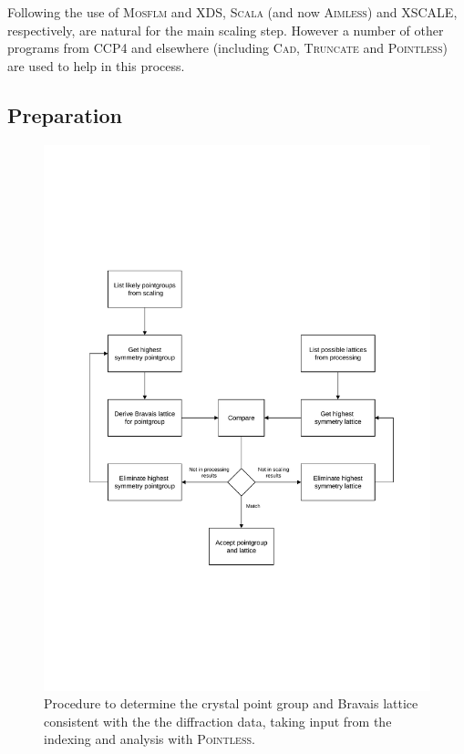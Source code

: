 \documentclass[preprint,pdf]{iucr}
\begin{document}
Following the use of \textsc{Mosflm} and XDS, \textsc{Scala} (and now \textsc{Aimless}) and
XSCALE, respectively, 
are natural for the main scaling step. However a number of other
programs from CCP4 and elsewhere (including \textsc{Cad}, 
\textsc{Truncate} and
\textsc{Pointless}) are used to help in this process.

\subsection{Preparation}

\begin{figure}
\caption{Procedure to determine the crystal point group and Bravais
  lattice consistent with the the diffraction data, taking input from
  the indexing and analysis with \textsc{Pointless}.
\label{figure:scaling_1}}
\centering
\includegraphics[scale=0.5]{figures/scaling-step-1.pdf}
\end{figure}
\end{document}
